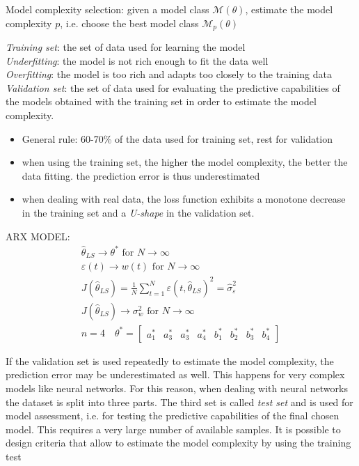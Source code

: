 \documentclass{book}
\begin{document}
Model complexity selection: given a model class $\mathcal{M}(\theta)$, estimate the model complexity $p$, i.e. choose the best model class $\mathcal{M}_p(\theta)$

\emph{Training set}: the set of data used for learning the model\\
\emph{Underfitting}: the model is not rich enough to fit the data well\\
\emph{Overfitting}: the model is too rich and adapts too closely to the training data\\
\emph{Validation set}: the set of data used for evaluating the predictive capabilities of the models obtained with the training set in order to estimate the model complexity.
\begin{itemize}
    \item General rule: 60-70\% of the data used for training set, rest for validation 
    \item when using the training set, the higher the model complexity, the better the data fitting. the prediction error is thus underestimated
    \item when dealing with real data, the loss function exhibits a monotone decrease in the training set and a \emph{U-shape} in the validation set.
\end{itemize}

ARX MODEL: 
\begin{gather*}
    \hat{\theta}_{LS} \to \theta^* \text{ for } N\to \infty\\
    \varepsilon(t) \to w(t) \text{ for } N\to\infty\\
    J(\hat{\theta}_{LS})=\displaystyle\frac{1}{N}\displaystyle\sum_{t=1}^{N}\varepsilon(t,\hat{\theta}_{LS})^2 = \hat{\sigma}_\varepsilon^2\\
    J(\hat{\theta}_{LS}) \to \sigma_w^2 \text{ for } N\to \infty\\
    n=4 \quad \theta^* = \begin{bmatrix}
        a_1^* & a_3^* & a_3^* & a_4^* & b_1^* &  b_2^* & b_3^* & b_4^*
    \end{bmatrix}
\end{gather*}

If the validation set is used repeatedly to estimate the model complexity, the prediction error may be underestimated as well. This happens for very complex models like neural networks. For this reason, when dealing with neural networks the dataset is split into three parts. The third set is called \emph{test set} and is used for model assessment, i.e. for testing the predictive capabilities of the final chosen model. This requires a very large number of available samples. It is possible to design criteria that allow to estimate the model complexity by using the training test
\end{document}
